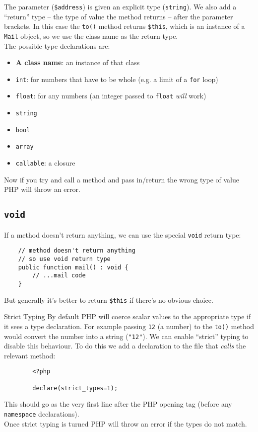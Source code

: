 The parameter (\texttt{\$address}) is given an explicit type (\texttt{string}). We also add a ``return'' type – the type of value the method returns – after the parameter brackets. In this case the \texttt{to()} method returns \texttt{\$this}, which is an instance of a \texttt{Mail} object, so we use the class name as the return type.
\\

The possible type declarations are:

\begin{itemize}
    \item \textbf{A class name}: an instance of that class
    \item \texttt{int}: for numbers that have to be whole (e.g. a limit of a \texttt{for} loop)
    \item \texttt{float}: for any numbers (an integer passed to \texttt{float} \textit{will} work)
    \item \texttt{string}
    \item \texttt{bool}
    \item \texttt{array}
    \item \texttt{callable}: a closure
\end{itemize}

Now if you try and call a method and pass in/return the wrong type of value PHP will throw an error.

\subsection{\texttt{void}}

If a method doesn't return anything, we can use the special \texttt{void} return type:

\begin{verbatim}
    // method doesn't return anything
    // so use void return type
    public function mail() : void {
        // ...mail code
    }
\end{verbatim}

But generally it's better to return \texttt{\$this} if there's no obvious choice.

\begin{infobox}{Strict Typing}
    By default PHP will coerce scalar values to the appropriate type if it sees a type declaration. For example passing \texttt{12} (a number) to the \texttt{to()} method would convert the number into a string (\texttt{"12"}). We can enable ``strict'' typing to disable this behaviour. To do this we add a declaration to the file that \textit{calls} the relevant method:

    \begin{verbatim}
        <?php

        declare(strict_types=1);
    \end{verbatim}

    This should go as the very first line after the PHP opening tag (before any \texttt{namespace} declarations).
    \\

    Once strict typing is turned PHP will throw an error if the types do not match.
\end{infobox}


